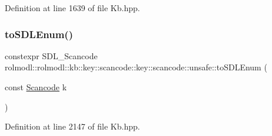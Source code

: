 Definition at line 1639 of file Kb.\+hpp.

\mbox{\label{namespacerolmodl_1_1rolmodl_1_1kb_1_1key_1_1scancode_1_1key_1_1scancode_1_1unsafe_a0067282e387d637e9d9808abc519d98c}} 
\subsubsection{\texorpdfstring{toSDLEnum()}{toSDLEnum()}}
{\footnotesize\ttfamily constexpr S\+D\+L\+\_\+\+Scancode rolmodl\+::rolmodl\+::kb\+::key\+::scancode\+::key\+::scancode\+::unsafe\+::to\+S\+D\+L\+Enum (\begin{DoxyParamCaption}\item[{const \mbox{\hyperlink{namespacerolmodl_1_1rolmodl_1_1kb_1_1key_af2e2c19a7e4c7347383cae496d850490}{Scancode}}}]{k }\end{DoxyParamCaption})\hspace{0.3cm}{\ttfamily [noexcept]}}



Definition at line 2147 of file Kb.\+hpp.

